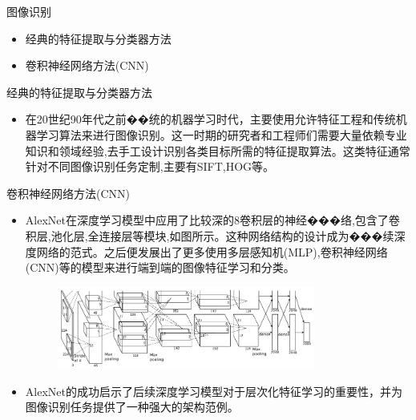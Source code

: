 \documentclass[UTF8,AutoFakeBold,AutoFakeSlant]{beamer}
\begin{document}
\begin{frame}{图像识别}
    \begin{itemize}
        \item 经典的特征提取与分类器方法
        \item 卷积神经网络方法(CNN)

    \end{itemize}
\end{frame}

\begin{frame}{经典的特征提取与分类器方法}
    \begin{itemize}
        \item 在20世纪90年代之前��统的机器学习时代，主要使用允许特征工程和传统机器学习算法来进行图像识别。这一时期的研究者和工程师们需要大量依赖专业知识和领域经验,去手工设计识别各类目标所需的特征提取算法。这类特征通常针对不同图像识别任务定制,主要有SIFT,HOG等。
    \end{itemize}
\end{frame}

\begin{frame}{卷积神经网络方法(CNN)}
    \scriptsize
    \begin{itemize}
        \item AlexNet在深度学习模型中应用了比较深的8卷积层的神经���络,包含了卷积层,池化层,全连接层等模块,如图所示。这种网络结构的设计成为���续深度网络的范式。之后便发展出了更多使用多层感知机(MLP),卷积神经网络(CNN)等的模型来进行端到端的图像特征学习和分类。

              \begin{figure}[H]
                  \centering
                  \includegraphics[width=0.8\textwidth]{img/2-Image Recognition/4.jpg}
              \end{figure}

        \item AlexNet的成功启示了后续深度学习模型对于层次化特征学习的重要性，并为图像识别任务提供了一种强大的架构范例。
    \end{itemize}
\end{frame}
\end{document}
